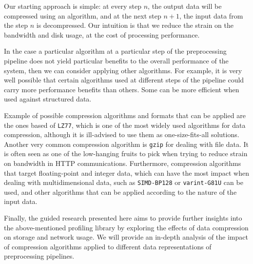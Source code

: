 \documentclass{article}
\begin{document}
Our starting approach is simple: at every step $n$, the output data will be compressed using an algorithm, and at the next step $n+1$, the input data from the step $n$ is decompressed. Our intuition is that we reduce the strain on the bandwidth and disk usage, at the cost of processing performance.

In the case a particular algorithm at a particular step of the preprocessing pipeline does not yield particular benefits to the overall performance of the system, then we can consider applying other algorithms. For example, it is very well possible that certain algorithms used at different steps of the pipeline could carry more performance benefits than others. Some can be more efficient when used against structured data.

Example of possible compression algorithms and formats that can be applied are the ones based of \texttt{LZ77}, which is one of the most widely used algorithms for data compression, although it is ill-advised to use them as one-size-fits-all solutions. Another very common compression algorithm is \texttt{gzip} for dealing with file data. It is often seen as one of the low-hanging fruits to pick when trying to reduce strain on bandwidth in HTTP communications. Furthermore, compression algorithms that target floating-point and integer data, which can have the most impact when dealing with multidimensional data, such as \texttt{SIMD-BP128} or \texttt{varint-G81U} \cite{Lemire_2013} can be used, and other algorithms that can be applied according to the nature of the input data.

Finally, the guided research presented here aims to provide further insights into the above-mentioned profiling library by exploring the effects of data compression on storage and network usage. We will provide an in-depth analysis of the impact of compression algorithms applied to different data representations of preprocessing pipelines.

\printbibliography
\end{document}
